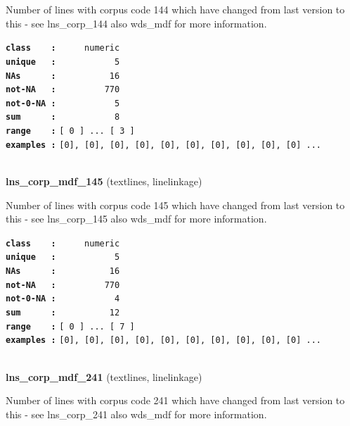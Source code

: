 \documentclass[]{article}
\begin{document}
Number of lines with corpus code 144 which have changed from last
version to this - see lns\_corp\_144 also wds\_mdf for more information.

\textbf{\texttt{class\ \ \ \ :}} \texttt{~~~~~numeric}\\
\textbf{\texttt{unique\ \ \ :}} \texttt{~~~~~~~~~~~5}\\
\textbf{\texttt{NAs\ \ \ \ \ \ :}} \texttt{~~~~~~~~~~16}\\
\textbf{\texttt{not-NA\ \ \ :}} \texttt{~~~~~~~~~770}\\
\textbf{\texttt{not-0-NA\ :}} \texttt{~~~~~~~~~~~5}\\
\textbf{\texttt{sum\ \ \ \ \ \ :}} \texttt{~~~~~~~~~~~8}\\
\textbf{\texttt{range\ \ \ \ :}}
\texttt{{[}\ 0\ {]}\ ...\ {[}\ 3\ {]}}\\
\textbf{\texttt{examples\ :}}
\texttt{{[}0{]},\ {[}0{]},\ {[}0{]},\ {[}0{]},\ {[}0{]},\ {[}0{]},\ {[}0{]},\ {[}0{]},\ {[}0{]},\ {[}0{]}\ ...}\\

~

\textbf{lns\_corp\_mdf\_145} (textlines, linelinkage)

Number of lines with corpus code 145 which have changed from last
version to this - see lns\_corp\_145 also wds\_mdf for more information.

\textbf{\texttt{class\ \ \ \ :}} \texttt{~~~~~numeric}\\
\textbf{\texttt{unique\ \ \ :}} \texttt{~~~~~~~~~~~5}\\
\textbf{\texttt{NAs\ \ \ \ \ \ :}} \texttt{~~~~~~~~~~16}\\
\textbf{\texttt{not-NA\ \ \ :}} \texttt{~~~~~~~~~770}\\
\textbf{\texttt{not-0-NA\ :}} \texttt{~~~~~~~~~~~4}\\
\textbf{\texttt{sum\ \ \ \ \ \ :}} \texttt{~~~~~~~~~~12}\\
\textbf{\texttt{range\ \ \ \ :}}
\texttt{{[}\ 0\ {]}\ ...\ {[}\ 7\ {]}}\\
\textbf{\texttt{examples\ :}}
\texttt{{[}0{]},\ {[}0{]},\ {[}0{]},\ {[}0{]},\ {[}0{]},\ {[}0{]},\ {[}0{]},\ {[}0{]},\ {[}0{]},\ {[}0{]}\ ...}\\

~

\textbf{lns\_corp\_mdf\_241} (textlines, linelinkage)

Number of lines with corpus code 241 which have changed from last
version to this - see lns\_corp\_241 also wds\_mdf for more information.
\end{document}
